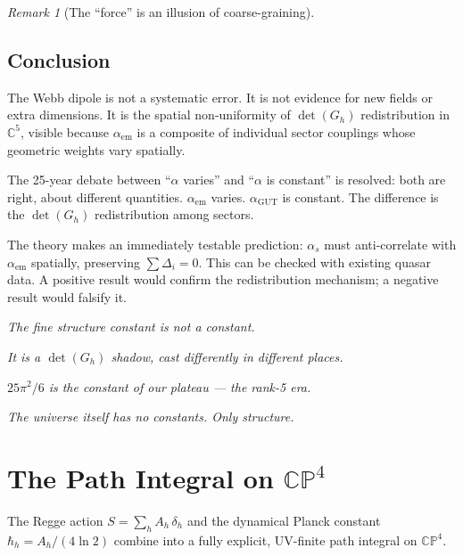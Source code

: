 \documentclass[12pt]{article}
\theoremstyle{remark}
\newtheorem{remark}[theorem]{Remark}
\theoremstyle{definition}
\newcommand{\CC}{\mathbb{C}}
\newcommand{\agut}{\alpha_{\mathrm{GUT}}}
\begin{document}
\begin{remark}[The ``force'' is an illusion of coarse-graining]
\subsection{Conclusion}

The Webb dipole is not a systematic error. It is not evidence for new fields or extra dimensions. It is the spatial non-uniformity of $\det(G_h)$ redistribution in $\CC^5$, visible because $\alpha_\text{em}$ is a composite of individual sector couplings whose geometric weights vary spatially.

The 25-year debate between ``$\alpha$ varies'' and ``$\alpha$ is constant'' is resolved: both are right, about different quantities. $\alpha_\text{em}$ varies. $\agut$ is constant. The difference is the $\det(G_h)$ redistribution among sectors.

The theory makes an immediately testable prediction: $\alpha_s$ must anti-correlate with $\alpha_\text{em}$ spatially, preserving $\sum\Delta_i = 0$. This can be checked with existing quasar data. A positive result would confirm the redistribution mechanism; a negative result would falsify it.

\begin{center}
\emph{The fine structure constant is not a constant.}

\emph{It is a $\det(G_h)$ shadow, cast differently in different places.}

\emph{$25\pi^2/6$ is the constant of our plateau --- the rank-5 era.}

\emph{The universe itself has no constants. Only structure.}
\end{center}



\section{The Path Integral on $\mathbb{CP}^4$}
\label{app:path_integral}

The Regge action $S = \sum_h A_h\,\delta_h$ and the dynamical Planck constant $\hbar_h = A_h/(4\ln 2)$ combine into a fully explicit, UV-finite path integral on $\mathbb{CP}^4$.


\end{remark}
\end{document}
